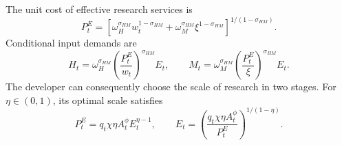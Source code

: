 The unit cost of effective research services is
\begin{equation}
    P^E_t
    =
    \left[
        \omega_H^{\sigma_{HM}} w_t^{1-\sigma_{HM}}
        +\omega_M^{\sigma_{HM}}\xi^{1-\sigma_{HM}}
    \right]^{1/(1-\sigma_{HM})}.
    \label{eq:research-unit-cost}
\end{equation}
Conditional input demands are
\begin{equation}
    H_t=\omega_H^{\sigma_{HM}}
    \left(\frac{P^E_t}{w_t}\right)^{\sigma_{HM}} E_t,
    \qquad
    M_t=\omega_M^{\sigma_{HM}}
    \left(\frac{P^E_t}{\xi}\right)^{\sigma_{HM}} E_t.
    \label{eq:research-conditional-demands}
\end{equation}
The developer can consequently choose the scale of research in two stages. For
$\eta\in(0,1)$, its optimal scale satisfies
\begin{equation}
    P^E_t=q_t\chi\eta A_t^\phi E_t^{\eta-1},
    \qquad
    E_t=
    \left(
        \frac{q_t\chi\eta A_t^\phi}{P^E_t}
    \right)^{1/(1-\eta)}.
    \label{eq:research-scale}
\end{equation}

